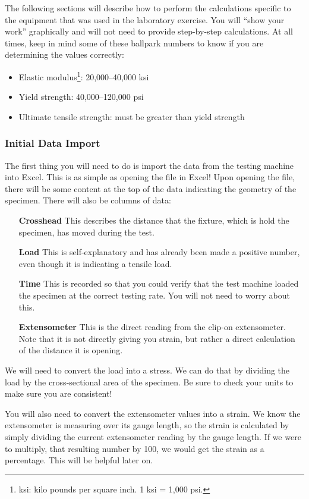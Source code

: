 \documentclass[12pt]{article}
\begin{document}
The following sections will describe how to perform the calculations specific to the equipment that was used in the laboratory exercise. You will ``show your work'' graphically and will not need to provide step-by-step calculations. At all times, keep in mind some of these ballpark numbers to know if you are determining the values correctly:
\begin{itemize}
    \item Elastic modulus\footnote{ksi: kilo pounds per square inch. 1 ksi = 1,000 psi.}: 20,000--40,000 ksi
    \item Yield strength: 40,000--120,000 psi
    \item Ultimate tensile strength: must be greater than yield strength
\end{itemize}

\subsubsection{Initial Data Import}
The first thing you will need to do is import the data from the testing machine into Excel. This is as simple as opening the file in Excel! Upon opening the file, there will be some content at the top of the data indicating the geometry of the specimen. There will also be columns of data:
\begin{itemize}
    \item[\textbf{Crosshead}] This describes the distance that the fixture, which is hold the specimen, has moved during the test.
    \item[\textbf{Load}] This is self-explanatory and has already been made a positive number, even though it is indicating a tensile load.
    \item[\textbf{Time}] This is recorded so that you could verify that the test machine loaded the specimen at the correct testing rate. You will not need to worry about this.
    \item[\textbf{Extensometer}] This is the direct reading from the clip-on extensometer. Note that it is not directly giving you strain, but rather a direct calculation of the distance it is opening.
\end{itemize}
We will need to convert the load into a stress. We can do that by dividing the load by the cross-sectional area of the specimen. Be sure to check your units to make sure you are consistent! 

You will also need to convert the extensometer values into a strain. We know the extensometer is measuring over its gauge length, so the strain is calculated by simply dividing the current extensometer reading by the gauge length. If we were to multiply, that resulting number by 100, we would get the strain as a percentage. This will be helpful later on.
\end{document}
